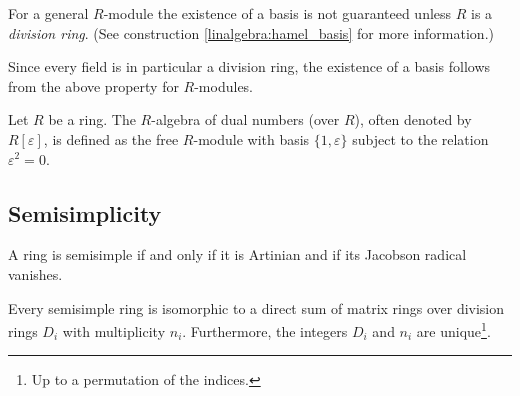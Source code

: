 
    \begin{property}\label{algebra:module_basis}
        For a general $R$-module the existence of a basis is not guaranteed unless $R$ is a \textit{division ring}. (See construction \ref{linalgebra:hamel_basis} for more information.)
    \end{property}
    \begin{result}
        Since every field is in particular a division ring, the existence of a basis follows from the above property for $R$-modules.
    \end{result}


    \begin{example}
        Let $R$ be a ring. The $R$-algebra of dual numbers (over $R$), often denoted by $R[\varepsilon]$, is defined as the free $R$-module with basis $\{1, \varepsilon\}$ subject to the relation $\varepsilon^2 = 0$.
    \end{example}

\subsection{Semisimplicity}

    \begin{property}[Condition]
        A ring is semisimple if and only if it is Artinian and if its Jacobson radical vanishes.
    \end{property}

    \begin{theorem}\label{algebra:artin_wedderburn}
        Every semisimple ring is isomorphic to a direct sum of matrix rings over division rings $D_i$ with multiplicity $n_i$. Furthermore, the integers $D_i$ and $n_i$ are unique\footnote{Up to a permutation of the indices.}.
    \end{theorem}

